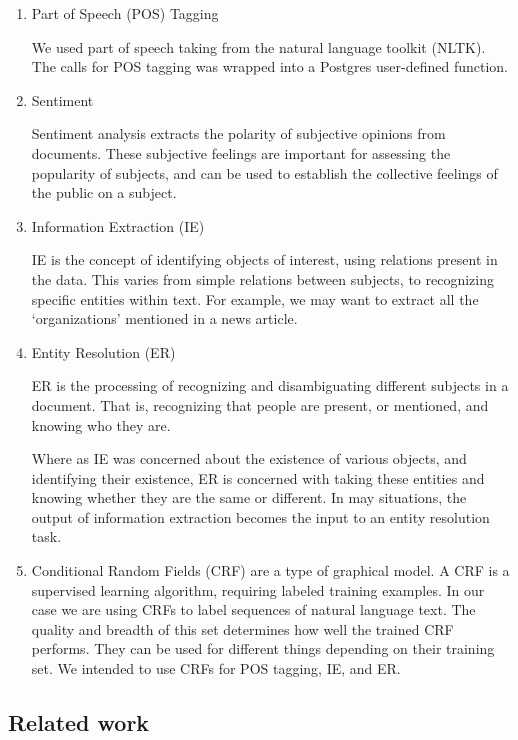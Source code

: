 \documentclass[11pt,onecolumn]{article}
\begin{document}
  \begin{enumerate}

  \item Part of Speech (POS) Tagging

	We used part of speech taking from the natural language toolkit (NLTK). 
	The calls for POS tagging was wrapped into a Postgres user-defined function.


  \item Sentiment

    Sentiment analysis extracts the polarity of subjective opinions from documents.
    These subjective feelings are important for assessing the popularity of subjects,
    and can be used to establish the collective feelings of the public on a subject.


  \item Information Extraction (IE) 

	IE is the concept of identifying objects of interest,
    using relations present in the data.
    This varies from simple relations between subjects,
    to recognizing specific entities within text.
		For example, we may want to extract all the `organizations' mentioned in 
		a news article.


  \item Entity Resolution (ER) 
	
		ER is the processing of recognizing and disambiguating different subjects in a document.
    That is, recognizing that people are present,
    or mentioned, and knowing who they are.

    Where as IE was concerned about the existence of various objects,
    and identifying their existence,
    ER is concerned with taking these entities and knowing whether they are the same or different.
		In may situations, the output of information extraction becomes the input 
		to an entity resolution task.


  \item Conditional Random Fields (CRF) are a type of graphical model.
    A CRF is a supervised learning algorithm, requiring labeled training examples.
    In our case we are using CRFs to label sequences of natural language text.
    The quality and breadth of this set determines how well the trained CRF performs.
    They can be used for different things depending on their training set.
    We intended to use CRFs for POS tagging, IE, and ER.

     \end{enumerate}
  \subsection{Related work}
\end{document}

